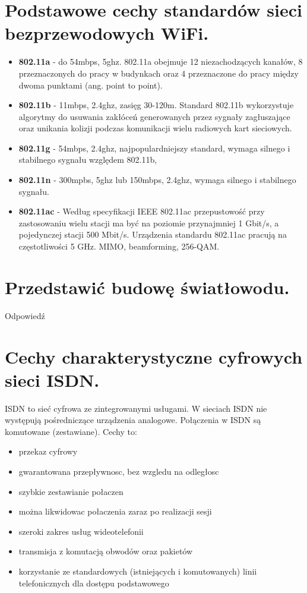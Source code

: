 \documentclass[12pt,a4paper]{article}
\begin{document}
	\section{Podstawowe cechy standardów sieci bezprzewodowych WiFi.}
	\begin{itemize}
		\item \textbf{802.11a} - do 54mbps, 5ghz. 802.11a obejmuje 12 niezachodzących kanałów, 8 przeznaczonych do pracy w budynkach oraz 4 przeznaczone do pracy między dwoma punktami (ang. point to point). 
		\item \textbf{802.11b} - 11mbps, 2.4ghz, zasięg 30-120m. Standard 802.11b wykorzystuje algorytmy do usuwania zakłóceń generowanych przez sygnały zagłuszające oraz unikania kolizji podczas komunikacji wielu radiowych kart sieciowych.
		\item \textbf{802.11g} - 54mbps, 2.4ghz, najpopulardniejszy standard, wymaga silnego i stabilnego sygnału względem 802.11b,
		\item \textbf{802.11n} - 300mpbs, 5ghz lub 150mbps, 2.4ghz, wymaga silnego i stabilnego sygnału.
		\item \textbf{802.11ac} - Według specyfikacji IEEE 802.11ac przepustowość przy zastosowaniu wielu stacji ma być na poziomie przynajmniej 1 Gbit/s, a pojedynczej stacji 500 Mbit/s. Urządzenia standardu 802.11ac pracują na częstotliwości 5 GHz. MIMO, beamforming, 256-QAM.
	\end{itemize}

	\section{Przedstawić budowę światłowodu.}
	Odpowiedź

	\section{Cechy charakterystyczne cyfrowych sieci ISDN.}
	ISDN to sieć cyfrowa ze zintegrowanymi usługami. W sieciach ISDN nie występują pośredniczące urządzenia analogowe. Połączenia w ISDN są komutowane (zestawiane). Cechy to:
	
	\begin{itemize}
		\item przekaz cyfrowy
		\item gwarantowana przepływnosc, bez wzgledu na odległosc
		\item szybkie zestawianie połaczen
		\item można likwidowac połaczenia zaraz po realizacji sesji
		\item szeroki zakres usług wideotelefonii
		\item transmisja z komutacją obwodów oraz pakietów
		\item korzystanie ze standardowych (istniejących i komutowanych) linii telefonicznych dla dostępu podstawowego
	\end{itemize}
\end{document}
